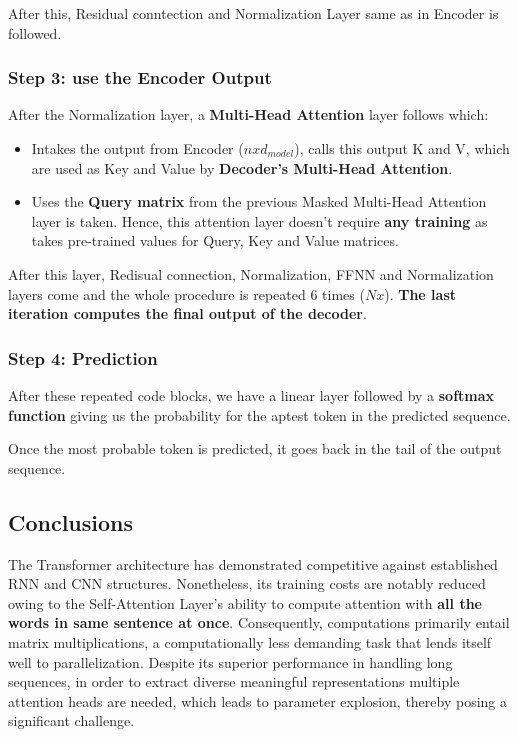 After this, Residual conntection and Normalization Layer same as in Encoder is followed.

\subsubsection{Step 3: use the Encoder Output}

After the Normalization layer, a \textbf{Multi-Head Attention} layer follows which:

\begin{itemize}
    \item Intakes the output from Encoder ($n x d_{model}$), calls this output K and V, which are used as Key and Value by \textbf{Decoder’s Multi-Head Attention}.
    \item Uses the \textbf{Query matrix} from the previous Masked Multi-Head Attention layer is taken. Hence, this attention layer doesn’t require \textbf{any training} as takes pre-trained values for Query, Key and Value matrices.
\end{itemize}

After this layer, Redisual connection, Normalization, FFNN and Normalization layers come and the whole procedure is repeated 6 times ($Nx$). \textbf{The last iteration computes the final output of the decoder}.

\subsubsection{Step 4: Prediction}

After these repeated code blocks, we have a linear layer followed by a \textbf{softmax function} giving us the probability for the aptest token in the predicted sequence.

Once the most probable token is predicted, it goes back in the tail of the output sequence.

\subsection{Conclusions}

The Transformer architecture has demonstrated competitive against established RNN and CNN structures. Nonetheless, its training costs are notably reduced owing to the Self-Attention Layer's ability to compute attention with \textbf{all the words in same sentence at once}. Consequently, computations primarily entail matrix multiplications, a computationally less demanding task that lends itself well to parallelization. Despite its superior performance in handling long sequences, in order to  extract diverse meaningful representations multiple attention heads are needed, which leads to parameter explosion, thereby posing a significant challenge.

